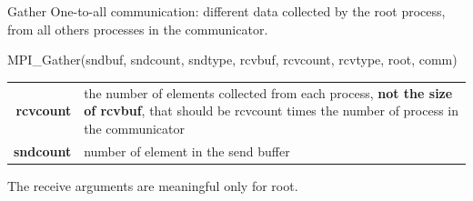 \documentclass[aspectratio=43]{beamer}
\begin{document}
\begin{frame}[fragile]{Gather}
One-to-all communication: different data collected by the root process, from all others processes in the communicator.\\
\begin{Pseudolisting}[]{}
MPI_Gather(sndbuf, sndcount, sndtype,
           rcvbuf, rcvcount, rcvtype, root, comm)
\end{Pseudolisting}
\begin{black1block}{}
\begin{tabular}{rp{8cm}}
    \textbf{rcvcount} & the number of elements collected from each process, {\textbf{not the size of rcvbuf}}, that should be rcvcount times the number of process in the communicator\\
\textbf{sndcount} & number of element in the send buffer\\
\end{tabular}
\end{black1block}
The receive arguments are meaningful only for root.
\end{frame}


%
\end{document}
